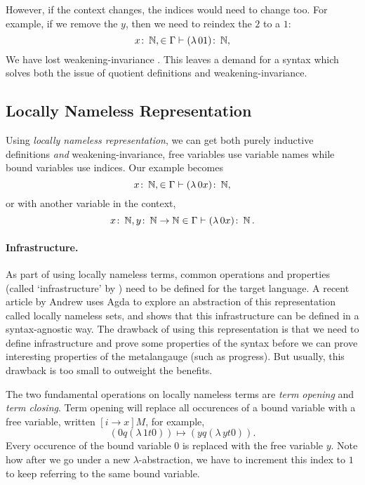 However, if the context changes, the indices would need to change too. For example, if we remove the
$y$, then we need to reindex the $2$ to a $1$:
\begin{equation*}
  x \colon \operatorname{\mathbb{N}}, \in \Gamma \vdash (\lambda \, 0 1) \colon \operatorname{\mathbb{N}},
\end{equation*}
We have lost weakening-invariance \citep{aydemir_engineering_2008}. This leaves a demand for a
syntax which solves both the issue of quotient definitions and weakening-invariance.

\subsection{Locally Nameless Representation}
Using \textit{locally nameless representation}, we can get both purely inductive definitions
\textit{and} weakening-invariance, free variables use variable names while bound variables use
indices. Our example becomes
\begin{equation*}
  x \colon \operatorname{\mathbb{N}}, \in \Gamma \vdash (\lambda \, 0 x) \colon \operatorname{\mathbb{N}},
\end{equation*}
or with another variable in the context,
\begin{equation*}
  x \colon \operatorname{\mathbb{N}}, y \colon \operatorname{\mathbb{N}} \to \operatorname{\mathbb{N}} \in \Gamma \vdash (\lambda \, 0 x) \colon \operatorname{\mathbb{N}}.
\end{equation*}

\paragraph*{Infrastructure.} As part of using locally nameless terms, common operations and properties (called `infrastructure'
by \citet{aydemir_engineering_2008}) need to be defined for the target language. A recent article by
Andrew \citet{pitts_locally_2023} uses Agda to explore an abstraction of this representation called
locally nameless sets, and shows that this infrastructure can be defined in a syntax-agnostic way.
The drawback of using this representation is that we need to define infrastructure and prove some
properties of the syntax before we can prove interesting properties of the metalangauge (such as
progress). But usually, this drawback is too small to outweight the benefits.

The two fundamental operations on locally nameless terms are \textit{term opening} and \textit{term
closing}. Term opening will replace all occurences of a bound variable with a free variable, written
$[i \to x] M$, for example,
\begin{equation*}
  [0 \to y] (0 q (\lambda \, 1 t 0)) \mapsto (y q (\lambda \, y t 0)).
\end{equation*}
Every occurence of the bound variable $0$ is replaced with the free variable $y$. Note how after we
go under a new $\lambda$-abstraction, we have to increment this index to $1$ to keep referring to
the same bound variable.

